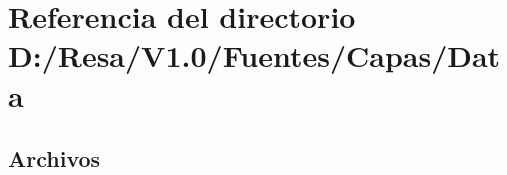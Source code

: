 \section{Referencia del directorio D\+:/\+Resa/\+V1.0/\+Fuentes/\+Capas/\+Data}
\label{dir_dae8b898067267ab6d8402a6236eca99}
\subsection*{Archivos}
\begin{DoxyCompactItemize}
\end{DoxyCompactItemize}

